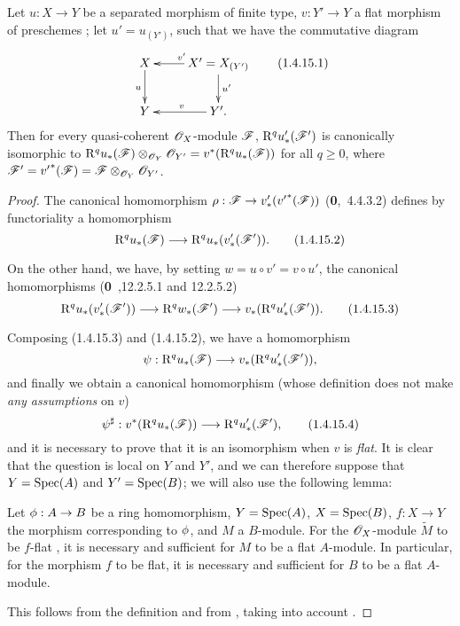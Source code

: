 \begin{proposition}[1.4.15]
\label{III.1.4.15}
Let $u:X\to Y$ be a separated morphism of finite type, $v:Y'\to Y$ a flat morphism of preschemes ; let $u'=u_{(Y')}$, such that we have the commutative diagram
\[
  \xymatrix{
    X\ar[d]_u &
    X'=X_{(Y')}\ar[l]_{v'}\ar[d]^{u'}\\
    Y &
    Y'\ar[l]_{v}.
  }
  \tag{1.4.15.1}
\]
Then for every quasi-coherent $\mathscr{O}_X$-module $\mathscr{F}$, $\mathrm{R}^q u_*'(\mathscr{F}')$ is canonically isomorphic to $\mathrm{R}^q u_*(\mathscr{F})\otimes_{\mathscr{O}_Y}\mathscr{O}_{Y'}=v^*(\mathrm{R}^q u_*(\mathscr{F}))$ for all $q\geq 0$, where $\mathscr{F}'={v'}^*(\mathscr{F})=\mathscr{F}\otimes_{\mathscr{O}_Y}\mathscr{O}_{Y'}$.
\end{proposition}

\begin{proof}
\label{proof-III.1.4.15}
The canonical homomorphism $\rho:\sh{F}\to v_*'({v'}^*(\sh{F}))$ (\textbf{0},~4.4.3.2) defines by functoriality a homomorphism
\[
  \RR^q u_*(\sh{F})\to\RR^q u_*(v_*'(\sh{F}')).
  \tag{1.4.15.2}
\]

On the other hand, we have, by setting $w=u\circ v'=v\circ u'$, the canonical homomorphisms (\textbf{0}~,12.2.5.1 and 12.2.5.2)
\[
  \RR^q u_*(v_*'(\sh{F}'))\to\RR^q w_*(\sh{F}')\to v_*(\RR^q u_*'(\sh{F}')).
  \tag{1.4.15.3}
\]

Composing (1.4.15.3) and (1.4.15.2), we have a homomorphism
\[
  \psi:\RR^q u_*(\sh{F})\to v_*(\RR^q u_*'(\sh{F}')),
\]
and finally we obtain a canonical homomorphism (whose definition does not make \emph{any assumptions} on $v$)
\[
  \psi^\sharp:v^*(\RR^q u_*(\sh{F}))\to\RR^q u_*'(\sh{F}'),
  \tag{1.4.15.4}
\]
and it is necessary to prove that it is an isomorphism when $v$ is \emph{flat}.
It is clear that the question is local on $Y$ and $Y'$, and we can therefore suppose that $Y=\operatorname{Spec}(A)$ and $Y'=\operatorname{Spec}(B)$; we will also use the following lemma:
\begin{lemma}[1.4.15.5]
\label{III.1.4.15.5}
Let $\vphi:A\to B$ be a ring homomorphism, $Y=\operatorname{Spec}(A)$, $X=\operatorname{Spec}(B)$, $f:X\to Y$ the morphism corresponding to $\phi$, and $M$ a $B$-module.
For the $\mathscr{O}_X$-module $\widetilde{M}$ to be $f$-flat , it is necessary and sufficient for $M$ to be a flat $A$-module.
In particular, for the morphism $f$ to be flat, it is necessary and sufficient for $B$ to be a flat $A$-module.
\end{lemma}

This follows from the definition  and from , taking into account .


\end{proof}

